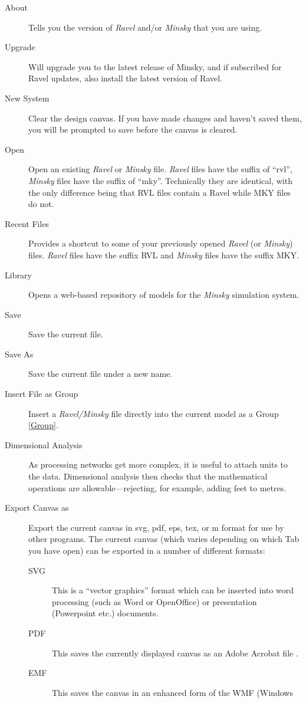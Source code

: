 \label{File}
\begin{description}
\item [{About}] Tells you the version of \emph{Ravel} and/or \emph{Minsky}
  that you are using.
\item[Upgrade] Will upgrade you to the latest release of Minsky, and
  if subscribed for Ravel updates, also install the latest version of Ravel.
\item [{New System}] Clear the design canvas. If you have made changes
and haven't saved them, you will be prompted to save before the canvas
is cleared.
\item [{Open}] Open an existing \emph{Ravel} or \emph{Minsky} file. \emph{Ravel}
files have the suffix of ``rvl'', \emph{Minsky} files have the suffix
of ``mky''. Technically they are identical, with the only difference
being that RVL files contain a Ravel while MKY files do not.
\item [{Recent Files}] \label{recentfiles} Provides a shortcut to some
of your previously opened \emph{Ravel} (or \emph{Minsky}) files. \emph{Ravel}
files have the suffix RVL and \emph{Minsky }files have the suffix
MKY.
\item [{Library}] Opens a web-based repository of models for the \emph{Minsky}
simulation system.
\item [{Save}] Save the current file.
\item [{Save As}] Save the current file under a new name.
\item [{Insert File as Group}] Insert a \emph{Ravel/Minsky} file directly
into the current model as a Group \ref{Group}.
\item [{Dimensional Analysis}] As processing networks
get more complex, it is useful to attach units to the
data. Dimensional analysis then checks that the mathematical
operations are allowable---rejecting, for example, adding feet to
metres.
\item [{Export Canvas as}] Export the current canvas in svg, pdf, eps,
tex, or m format for use by other programs. The current canvas (which
varies depending on which Tab you have open) can be exported in a
number of different formats:
\begin{description}
\item[SVG] This is a ``vector graphics'' format which can be inserted into
word processing (such as Word or OpenOffice) or presentation (Powerpoint
etc.) documents. 
\item[PDF] This saves the currently displayed canvas as an Adobe Acrobat
file .
\item[EMF] This saves the canvas in an enhanced form of the WMF (Windows

\end{description}
\end{description}
